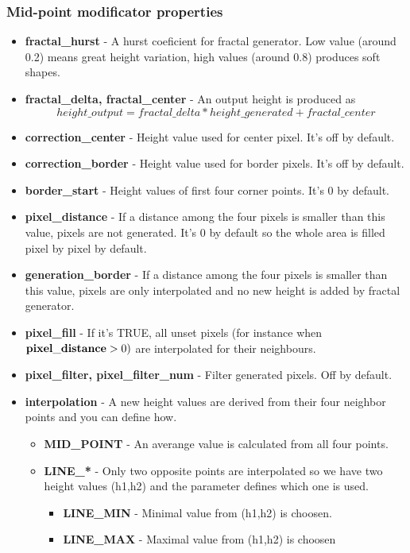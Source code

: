 \documentclass[9pt]{article}
\begin{document}
\subsubsection*{Mid-point modificator properties}
\begin{itemize}
\item{\bf fractal\_hurst} - A hurst coeficient for fractal generator. Low value 
(around 0.2) means great height variation, high values (around 0.8) produces soft shapes.
\item{\bf fractal\_delta, fractal\_center} - An output height is produced as
\[
height\_output = fractal\_delta * height\_generated + fractal\_center
\]
\item{\bf correction\_center} - Height value used for center pixel. It's off by default.
\item{\bf correction\_border} - Height value used for border pixels. It's off by default.
\item{\bf border\_start} - Height values of first four corner points. It's 0 by default.
\item{\bf pixel\_distance} - If a distance among the four pixels is smaller than this value,
pixels are not generated. It's 0 by default so the whole area is filled pixel by pixel by default.
\item{\bf generation\_border} - If a distance among the four pixels is smaller than this value,
pixels are only interpolated and no new height is added by fractal generator.
\item{\bf pixel\_fill} - If it's TRUE, all unset pixels (for instance when 
\begin{math}{\bf pixel\_distance} > 0)\end{math} are interpolated for their neighbours.
\item{\bf pixel\_filter, pixel\_filter\_num} - Filter generated pixels. Off by default.
\item{\bf interpolation} - A new height values are derived
from their four neighbor points and you can define how.
\begin{itemize}
\item{\bf MID\_POINT} - An averange value is calculated from all four points.
\item{\bf LINE\_*} - Only two opposite points are interpolated so we have two 
height values (h1,h2) and the parameter defines which one is used.
\begin{itemize}
\item{\bf LINE\_MIN} - Minimal value from (h1,h2) is choosen.
\item{\bf LINE\_MAX} - Maximal value from (h1,h2) is choosen

\end{itemize}
\end{itemize}
\end{itemize}
\end{document}
